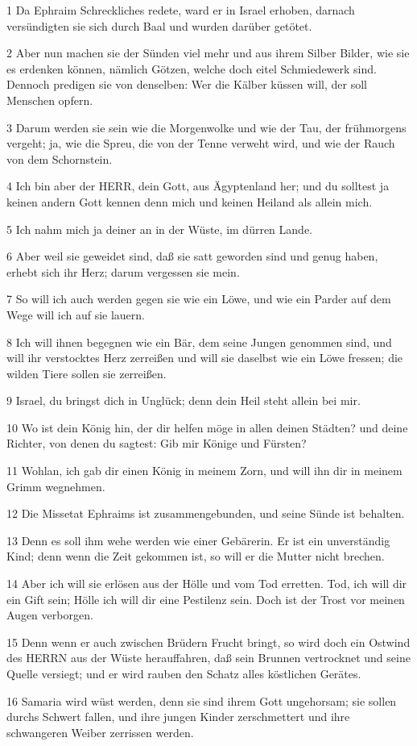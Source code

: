 \par 1 Da Ephraim Schreckliches redete, ward er in Israel erhoben, darnach versündigten sie sich durch Baal und wurden darüber getötet.
\par 2 Aber nun machen sie der Sünden viel mehr und aus ihrem Silber Bilder, wie sie es erdenken können, nämlich Götzen, welche doch eitel Schmiedewerk sind. Dennoch predigen sie von denselben: Wer die Kälber küssen will, der soll Menschen opfern.
\par 3 Darum werden sie sein wie die Morgenwolke und wie der Tau, der frühmorgens vergeht; ja, wie die Spreu, die von der Tenne verweht wird, und wie der Rauch von dem Schornstein.
\par 4 Ich bin aber der HERR, dein Gott, aus Ägyptenland her; und du solltest ja keinen andern Gott kennen denn mich und keinen Heiland als allein mich.
\par 5 Ich nahm mich ja deiner an in der Wüste, im dürren Lande.
\par 6 Aber weil sie geweidet sind, daß sie satt geworden sind und genug haben, erhebt sich ihr Herz; darum vergessen sie mein.
\par 7 So will ich auch werden gegen sie wie ein Löwe, und wie ein Parder auf dem Wege will ich auf sie lauern.
\par 8 Ich will ihnen begegnen wie ein Bär, dem seine Jungen genommen sind, und will ihr verstocktes Herz zerreißen und will sie daselbst wie ein Löwe fressen; die wilden Tiere sollen sie zerreißen.
\par 9 Israel, du bringst dich in Unglück; denn dein Heil steht allein bei mir.
\par 10 Wo ist dein König hin, der dir helfen möge in allen deinen Städten? und deine Richter, von denen du sagtest: Gib mir Könige und Fürsten?
\par 11 Wohlan, ich gab dir einen König in meinem Zorn, und will ihn dir in meinem Grimm wegnehmen.
\par 12 Die Missetat Ephraims ist zusammengebunden, und seine Sünde ist behalten.
\par 13 Denn es soll ihm wehe werden wie einer Gebärerin. Er ist ein unverständig Kind; denn wenn die Zeit gekommen ist, so will er die Mutter nicht brechen.
\par 14 Aber ich will sie erlösen aus der Hölle und vom Tod erretten. Tod, ich will dir ein Gift sein; Hölle ich will dir eine Pestilenz sein. Doch ist der Trost vor meinen Augen verborgen.
\par 15 Denn wenn er auch zwischen Brüdern Frucht bringt, so wird doch ein Ostwind des HERRN aus der Wüste herauffahren, daß sein Brunnen vertrocknet und seine Quelle versiegt; und er wird rauben den Schatz alles köstlichen Gerätes.
\par 16 Samaria wird wüst werden, denn sie sind ihrem Gott ungehorsam; sie sollen durchs Schwert fallen, und ihre jungen Kinder zerschmettert und ihre schwangeren Weiber zerrissen werden.

